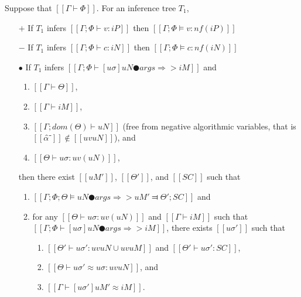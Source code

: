 \begin{lemma}
    \label{lemma:typing-completeness}
    Suppose that $[[Γ ⊢ Φ]]$.
    For an inference tree $T_1$,
    \begin{itemize}
        \item [$+$] If $T_1$ infers $[[Γ; Φ ⊢ v : iP]]$ then $[[Γ; Φ ⊨ v : nf(iP)]]$        
        \item [$-$] If $T_1$ infers $[[Γ; Φ ⊢ c : iN]]$ then  $[[Γ; Φ ⊨ c : nf(iN)]]$
        \item [$\bullet$] If 
            $T_1$ infers $[[Γ; Φ ⊢ [uσ]uN ● args ⇒> iM]]$
            and 
            \begin{enumerate}
                \item $[[Γ ⊢ Θ]]$, 
                \item $[[Γ ⊢ iM]]$,
                \item $[[Γ; dom(Θ) ⊢ uN]]$ (free from negative algorithmic variables, that is $[[α̂⁻]] \notin [[uv uN]]$), and
                \item $[[Θ ⊢ uσ : uv(uN)]]$,
            \end{enumerate}
            then there exist $[[uM']]$, $[[Θ']]$, and $[[SC]]$ such that
            \begin{enumerate}
                \item $[[ Γ; Φ; Θ ⊨ uN ● args ⇒> uM' ⫤ Θ'; SC ]]$ and
                \item for any $[[Θ ⊢ uσ : uv(uN)]]$ and $[[Γ ⊢ iM]]$
                    such that $[[Γ; Φ ⊢ [uσ]uN ● args ⇒> iM]]$, 
                    there exists $[[uσ']]$ such that 
                    \begin{enumerate}
                        \item $[[Θ' ⊢ uσ' : uv uN ∪ uv uM]]$
                            and $[[Θ' ⊢ uσ' : SC]]$,
                        \item $[[Θ ⊢ uσ' ≈ uσ : uv uN]]$, and 
                        \item $[[Γ ⊢ [uσ']uM' ≈ iM]]$.
                    \end{enumerate}
            \end{enumerate}
    \end{itemize}
\end{lemma}
